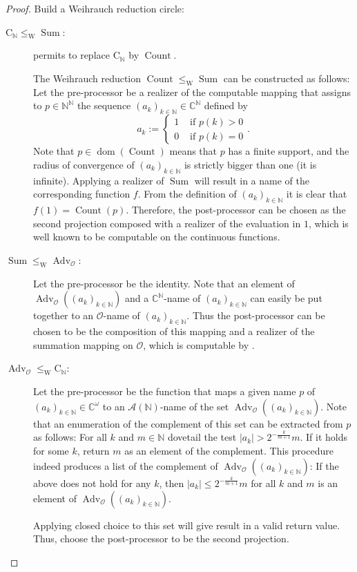 \documentclass{eptcs-modified}
\newcommand{\dom}{\operatorname{dom}}
\newcommand{\Baire}{{\mathbb{N}^\mathbb{N}}}
\newcommand{\leqW}{\leq_{\textrm{W}}}
\newcommand{\CCN}{\mathrm{C}_{\NN}}
\newcommand{\NN}{\mathbb{N}}
\newcommand{\CC}{\mathbb{C}}
\newcommand{\OO}{\mathcal{O}}
\newcommand{\A}{\mathcal A}
\newcommand{\abs}[1]{\left|#1\right|}
\newcommand{\germs}{\OO}
\newcommand{\Sum}{\operatorname{Sum}}
\newcommand{\Advg}{\operatorname{Adv}_{\germs}}
\newcommand{\Count}{\operatorname{Count}}
\begin{document}
			\begin{proof}
			Build a Weihrauch reduction circle:
				\begin{description}
					\item[$\CCN\leqW\Sum$:]
					 permits to replace $\CCN$ by $\Count$.

					The Weihrauch reduction $\Count\leqW\Sum$ can be constructed as follows:
					Let the pre-processor be a realizer of the computable mapping that assigns to $p \in \Baire$ the sequence $(a_k)_{k\in\NN}\in \CC^\NN$ defined by
					\[ a_k :=\begin{cases} 1 & \text{ if }p(k)>0 \\ 0 &\text{ if }p(k)=0\end{cases}. \]
					Note that $p\in \dom(\Count)$ means that $p$ has a finite support, and the radius of convergence of $(a_k)_{k\in\NN}$ is strictly bigger than one (it is infinite).
					Applying a realizer of $\Sum$ will result in a name of the corresponding function $f$.
					From the definition of $(a_k)_{k\in\NN}$ it is clear that $f(1) = \Count(p)$.
					Therefore, the post-processor can be chosen as the second projection composed with a realizer of the evaluation in $1$, which is well known to be computable on the continuous functions.
				\item[$\Sum\leqW\Advg$:]
					Let the pre-processor be the identity.
					Note that an element of $\Advg((a_k)_{k\in\NN})$ and a $\CC^\NN$-name of $(a_k)_{k\in\NN}$ can easily be put together to an $\germs$-name of $(a_k)_{k\in\NN}$.
					Thus the post-processor can be chosen to be the composition of this mapping and a realizer of the summation mapping on $\OO$, which is computable by .
				\item[$\Advg\leqW\CCN$:]
					Let the pre-processor be the function that maps a given name $p$ of $(a_k)_{k\in\NN}\in\CC^{\omega}$ to an $\A(\NN)$-name of the set $\Advg((a_k)_{k\in\NN})$.
					Note that an enumeration of the complement of this set can be extracted from $p$ as follows:
					For all $k$ and $m\in\NN$ dovetail the test $\abs{a_k}>2^{-\frac k{m+1}}m$.
					If it holds for some $k$, return $m$ as an element of the complement.
					This procedure indeed produces a list of the complement of $\Advg((a_k)_{k\in\NN})$:
					If the above does not hold for any $k$, then $\abs{a_k}\leq 2^{-\frac k{m+1}}m$ for all $k$ and $m$ is an element of $\Advg((a_k)_{k\in\NN})$.

					Applying closed choice to this set will give result in a valid return value.
					Thus, choose the post-processor to be the second projection.
				\end{description}
			\end{proof}
\end{document}

